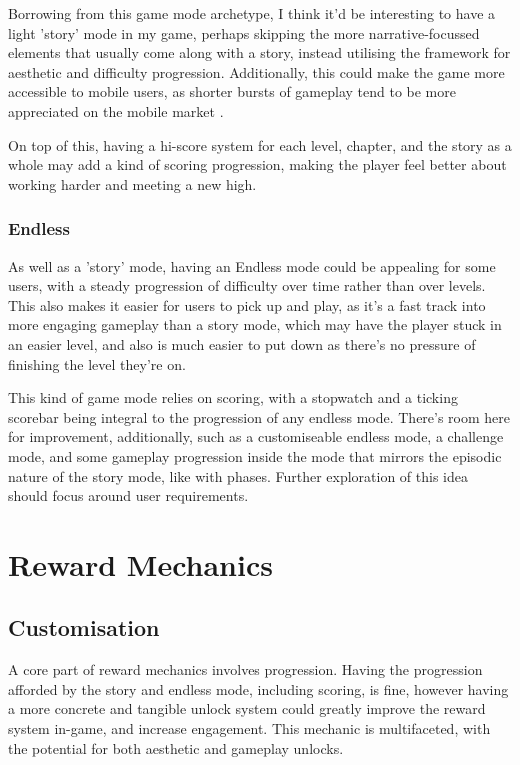 \documentclass{scrartcl}
\let\citep\autocite
\begin{document}
Borrowing from this game mode archetype, I think it'd be interesting to have a light 'story' mode in my game, perhaps skipping the more narrative-focussed elements that usually come along with a story, instead utilising the framework for aesthetic and difficulty progression. Additionally, this could make the game more accessible to mobile users, as shorter bursts of gameplay tend to be more appreciated on the mobile market \citep{Verto001}.

On top of this, having a hi-score system for each level, chapter, and the story as a whole may add a kind of scoring progression, making the player feel better about working harder and meeting a new high.

\subsubsection{Endless}

As well as a 'story' mode, having an Endless mode could be appealing for some users, with a steady progression of difficulty over time rather than over levels. This also makes it easier for users to pick up and play, as it's a fast track into more engaging gameplay than a story mode, which may have the player stuck in an easier level, and also is much easier to put down as there's no pressure of finishing the level they're on.

This kind of game mode relies on scoring, with a stopwatch and a ticking scorebar being integral to the progression of any endless mode. There's room here for improvement, additionally, such as a customiseable endless mode, a challenge mode, and some gameplay progression inside the mode that mirrors the episodic nature of the story mode, like with phases. Further exploration of this idea should focus around user requirements.

\section{Reward Mechanics}

\subsection{Customisation}

A core part of reward mechanics involves progression. Having the progression afforded by the story and endless mode, including scoring, is fine, however having a more concrete and tangible unlock system could greatly improve the reward system in-game, and increase engagement. This mechanic is multifaceted, with the potential for both aesthetic and gameplay unlocks.
\end{document}
